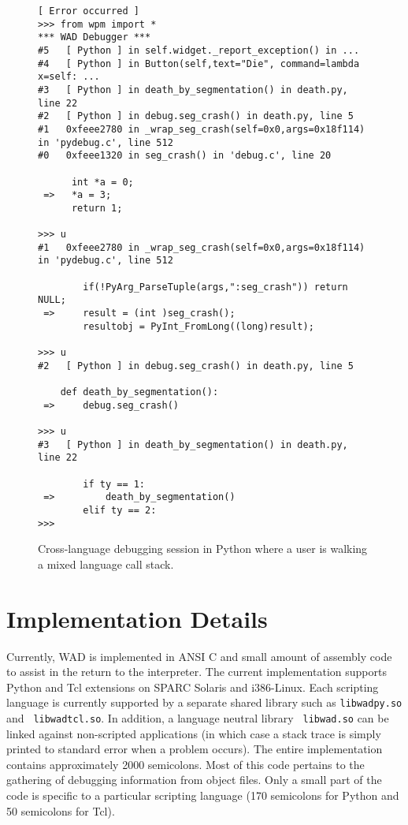 \begin{figure*}[t]
{\small
\begin{verbatim}
[ Error occurred ]
>>> from wpm import *
*** WAD Debugger ***
#5   [ Python ] in self.widget._report_exception() in ...
#4   [ Python ] in Button(self,text="Die", command=lambda x=self: ...
#3   [ Python ] in death_by_segmentation() in death.py, line 22
#2   [ Python ] in debug.seg_crash() in death.py, line 5
#1   0xfeee2780 in _wrap_seg_crash(self=0x0,args=0x18f114) in 'pydebug.c', line 512
#0   0xfeee1320 in seg_crash() in 'debug.c', line 20

      int *a = 0;
 =>   *a = 3;
      return 1;

>>> u
#1   0xfeee2780 in _wrap_seg_crash(self=0x0,args=0x18f114) in 'pydebug.c', line 512
        
        if(!PyArg_ParseTuple(args,":seg_crash")) return NULL;
 =>     result = (int )seg_crash();
        resultobj = PyInt_FromLong((long)result);

>>> u
#2   [ Python ] in debug.seg_crash() in death.py, line 5
    
    def death_by_segmentation():
 =>     debug.seg_crash()
    
>>> u
#3   [ Python ] in death_by_segmentation() in death.py, line 22

        if ty == 1:
 =>         death_by_segmentation()
        elif ty == 2:
>>> \end{verbatim}
}
\caption{Cross-language debugging session in Python where a user is walking a mixed language call stack.}
\end{figure*}

\section{Implementation Details}

Currently, WAD is implemented in ANSI C and small amount of assembly
code to assist in the return to the interpreter.  The current
implementation supports Python and Tcl extensions on SPARC Solaris and
i386-Linux.  Each scripting language is currently supported by a
separate shared library such as {\tt libwadpy.so} and {\tt
libwadtcl.so}.  In addition, a language neutral library {\tt
libwad.so} can be linked against non-scripted applications (in which case
a stack trace is simply printed to standard error when a problem occurs). 
The entire implementation contains approximately 2000
semicolons. Most of this code pertains to the gathering of debugging
information from object files.  Only a small part of the code is
specific to a particular scripting language (170 semicolons for Python
and 50 semicolons for Tcl).

